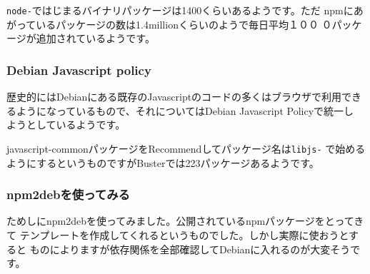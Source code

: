 \documentclass[mingoth,a4paper]{jsarticle}
\begin{document}
\texttt{node-}ではじまるバイナリパッケージは1400くらいあるようです。ただ
npmにあがっているパッケージの数は1.4millionくらいのようで毎日平均１００
０パッケージが追加されているようです。

\subsubsection{Debian Javascript policy}

歴史的にはDebianにある既存のJavascriptのコードの多くはブラウザで利用でき
るようになっているもので、それについてはDebian Javascript Policyで統一し
ようとしているようです\cite{debian-javascript-policy}。

javascript-commonパッケージをRecommendしてパッケージ名は\texttt{libjs-}
で始めるようにするというものですがBusterでは223パッケージあるようです。

\subsubsection{npm2debを使ってみる}

ためしにnpm2debを使ってみました。公開されているnpmパッケージをとってきて
テンプレートを作成してくれるというものでした。しかし実際に使おうとすると
ものによりますが依存関係を全部確認してDebianに入れるのが大変そうです。
\end{document}
